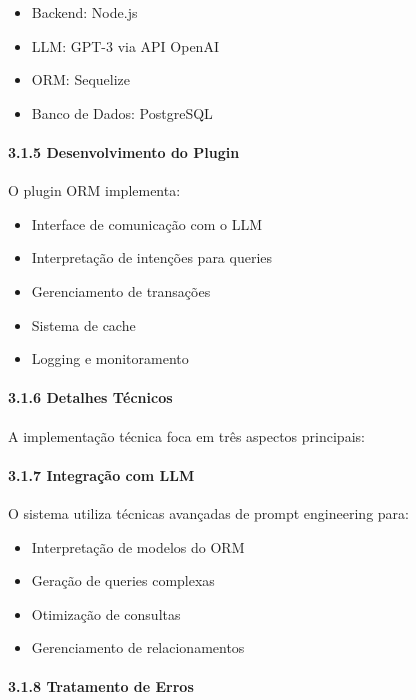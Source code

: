 \documentclass[
]{article}
\providecommand{\tightlist}{%
  \setlength{\itemsep}{0pt}\setlength{\parskip}{0pt}}
\begin{document}
\begin{itemize}
\tightlist
\item
  Backend: Node.js
\item
  LLM: GPT-3 via API OpenAI
\item
  ORM: Sequelize
\item
  Banco de Dados: PostgreSQL
\end{itemize}

\paragraph{3.1.5 Desenvolvimento do
Plugin}\label{desenvolvimento-do-plugin}

O plugin ORM implementa:

\begin{itemize}
\tightlist
\item
  Interface de comunicação com o LLM
\item
  Interpretação de intenções para queries
\item
  Gerenciamento de transações
\item
  Sistema de cache
\item
  Logging e monitoramento
\end{itemize}

\paragraph{3.1.6 Detalhes Técnicos}\label{detalhes-tuxe9cnicos}

A implementação técnica foca em três aspectos principais:

\paragraph{3.1.7 Integração com LLM}\label{integrauxe7uxe3o-com-llm}

O sistema utiliza técnicas avançadas de prompt engineering para:

\begin{itemize}
\tightlist
\item
  Interpretação de modelos do ORM
\item
  Geração de queries complexas
\item
  Otimização de consultas
\item
  Gerenciamento de relacionamentos
\end{itemize}

\paragraph{3.1.8 Tratamento de Erros}\label{tratamento-de-erros}
\end{document}
